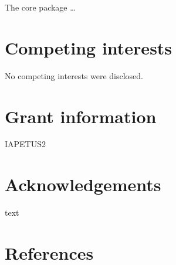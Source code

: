 \documentclass[10pt,a4paper]{article}
\begin{document}
The core package \ldots{}

\hypertarget{competing-interests}{%
\section{Competing interests}\label{competing-interests}}

No competing interests were disclosed.

\hypertarget{grant-information}{%
\section{Grant information}\label{grant-information}}

IAPETUS2

\hypertarget{acknowledgements}{%
\section{Acknowledgements}\label{acknowledgements}}

text

\hypertarget{references}{%
\section*{References}\label{references}}
\end{document}
